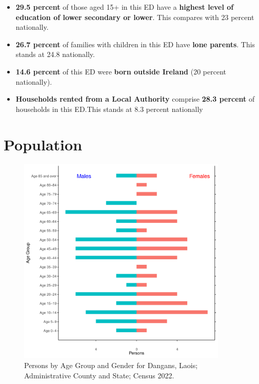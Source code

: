 \documentclass{article}
\begin{document}
\begin{itemize}
\item \textbf{29.5 percent} of those aged 15+ in this ED have a \textbf{highest level of education of lower secondary or lower}. This compares with 23 percent nationally. 

\item \textbf{26.7 percent} of families with children in this ED have \textbf{lone parents}. This stands at 24.8 nationally.

\item \textbf{14.6 percent} of this ED were \textbf{born outside Ireland} (20 percent nationally).

\item \textbf{Households rented from a Local Authority} comprise \textbf{28.3 percent} of households in this ED.This stands at 8.3 percent nationally

\end{itemize}

\pagebreak

\section{Population} 
\label{sect:Pop}

\begin{figure}[h]
	\centering
	\includegraphics[width = 100mm]{../figures/PyramidPlot.pdf}
	\caption{Persons by Age Group and Gender for Dangans, Laois; Administrative County and State; Census 2022.}
	\label{fig:2ae19629-1a6a-13a3-e055-000000000001}
	\end{figure}
\end{document}
